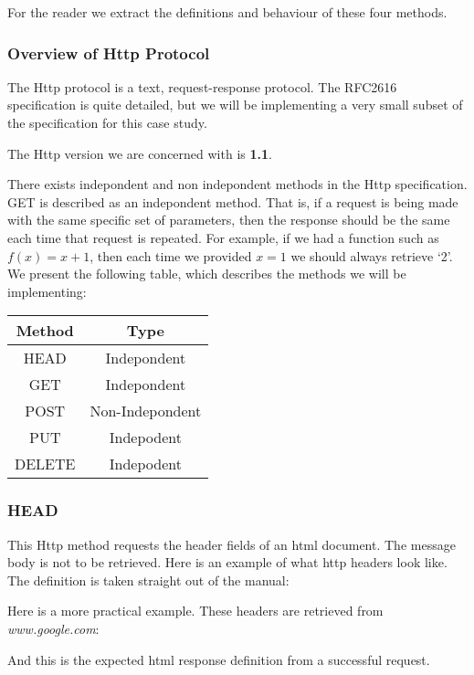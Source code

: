 For the reader we extract the definitions and behaviour of these four methods.
\subsubsection{Overview of Http Protocol}
The Http protocol is a text, request-response protocol. The RFC2616 
specification is quite detailed, but we will be implementing a very 
small subset of the specification for this case study.

The Http version we are concerned with is \textbf{1.1}.

There exists indepondent and non indepondent methods in the Http specification.
GET is described as an indepondent method. That is, if a request is being made
with the same specific set of parameters, then the response should be the same
each time that request is repeated. For example, if we had a function such as
$ f(x) = x + 1 $, then each time we provided $ x = 1 $ we should always retrieve
`2'. We present the following table, which describes the methods we will be 
implementing:
\\
\begin{center}
\begin{tabular}{| c | c |}
\hline
\textbf{Method} & \textbf{Type} \\ \hline \hline
HEAD   & Indepondent \\
GET    & Indepondent \\
POST   & Non-Indepondent \\
PUT    & Indepodent \\ 
DELETE & Indepodent \\
\hline
\end{tabular}
\end{center}
\subsubsection{HEAD}
This Http method requests the header fields of an html document. The message
body is not to be retrieved. Here is an example of what http headers look like.
The definition is taken straight out of the manual: 


Here is a more practical example. These headers are retrieved from \textit{www.google.com}:


And this is the expected html response definition from a successful request.


